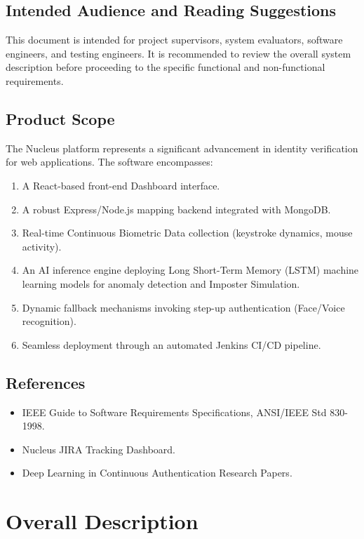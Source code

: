 \documentclass[12pt, a4paper]{article}
\begin{document}
\subsection{Intended Audience and Reading Suggestions}
This document is intended for project supervisors, system evaluators, software engineers, and testing engineers. It is recommended to review the overall system description before proceeding to the specific functional and non-functional requirements.

\subsection{Product Scope}
The Nucleus platform represents a significant advancement in identity verification for web applications. The software encompasses:
\begin{enumerate}
    \item A React-based front-end Dashboard interface.
    \item A robust Express/Node.js mapping backend integrated with MongoDB.
    \item Real-time Continuous Biometric Data collection (keystroke dynamics, mouse activity).
    \item An AI inference engine deploying Long Short-Term Memory (LSTM) machine learning models for anomaly detection and Imposter Simulation.
    \item Dynamic fallback mechanisms invoking step-up authentication (Face/Voice recognition).
    \item Seamless deployment through an automated Jenkins CI/CD pipeline.
\end{enumerate}

\subsection{References}
\begin{itemize}
    \item IEEE Guide to Software Requirements Specifications, ANSI/IEEE Std 830-1998.
    \item Nucleus JIRA Tracking Dashboard.
    \item Deep Learning in Continuous Authentication Research Papers.
\end{itemize}

\newpage
\section{Overall Description}
\end{document}
